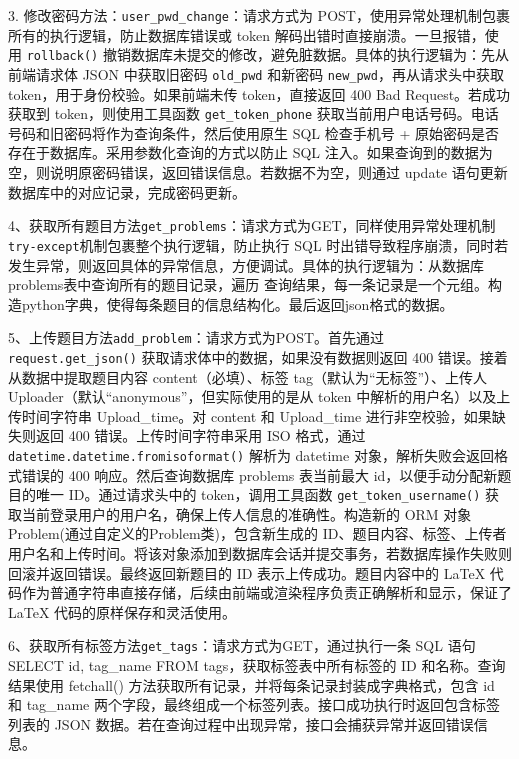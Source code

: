 \documentclass[a4paper,AutoFakeBold={2.7}]{ctexart} %
\begin{document}
3. 修改密码方法：\texttt{user\_pwd\_change}：请求方式为 POST，使用异常处理机制包裹所有的执行逻辑，防止数据库错误或 token 解码出错时直接崩溃。一旦报错，使用 \texttt{rollback()} 撤销数据库未提交的修改，避免脏数据。具体的执行逻辑为：先从前端请求体 JSON 中获取旧密码 \texttt{old\_pwd} 和新密码 \texttt{new\_pwd}，再从请求头中获取 token，用于身份校验。如果前端未传 token，直接返回 400 Bad Request。若成功获取到 token，则使用工具函数 \texttt{get\_token\_phone} 获取当前用户电话号码。电话号码和旧密码将作为查询条件，然后使用原生 SQL 检查手机号 + 原始密码是否存在于数据库。采用参数化查询的方式以防止 SQL 注入。如果查询到的数据为空，则说明原密码错误，返回错误信息。若数据不为空，则通过 update 语句更新数据库中的对应记录，完成密码更新。

4、获取所有题目方法\texttt{get\_problems}：请求方式为GET，同样使用异常处理机制\texttt{try-except}机制包裹整个执行逻辑，防止执行 SQL 时出错导致程序崩溃，同时若发生异常，则返回具体的异常信息，方便调试。具体的执行逻辑为：从数据库problems表中查询所有的题目记录，遍历 查询结果，每一条记录是一个元组。构造python字典，使得每条题目的信息结构化。最后返回json格式的数据。

5、上传题目方法\texttt{add\_problem}：请求方式为POST。首先通过 \texttt{request.get\_json()} 获取请求体中的数据，如果没有数据则返回 400 错误。接着从数据中提取题目内容 content（必填）、标签 tag（默认为“无标签”）、上传人 Uploader（默认“anonymous”，但实际使用的是从 token 中解析的用户名）以及上传时间字符串 Upload\_time。对 content 和 Upload\_time 进行非空校验，如果缺失则返回 400 错误。上传时间字符串采用 ISO 格式，通过 \texttt{datetime.datetime.fromisoformat()} 解析为 datetime 对象，解析失败会返回格式错误的 400 响应。然后查询数据库 problems 表当前最大 id，以便手动分配新题目的唯一 ID。通过请求头中的 token，调用工具函数 \texttt{get\_token\_username()} 获取当前登录用户的用户名，确保上传人信息的准确性。构造新的 ORM 对象 Problem(通过自定义的Problem类)，包含新生成的 ID、题目内容、标签、上传者用户名和上传时间。将该对象添加到数据库会话并提交事务，若数据库操作失败则回滚并返回错误。最终返回新题目的 ID 表示上传成功。题目内容中的 LaTeX 代码作为普通字符串直接存储，后续由前端或渲染程序负责正确解析和显示，保证了 LaTeX 代码的原样保存和灵活使用。

6、获取所有标签方法\texttt{get\_tags}：请求方式为GET，通过执行一条 SQL 语句 SELECT id, tag\_name FROM tags，获取标签表中所有标签的 ID 和名称。查询结果使用 fetchall() 方法获取所有记录，并将每条记录封装成字典格式，包含 id 和 tag\_name 两个字段，最终组成一个标签列表。接口成功执行时返回包含标签列表的 JSON 数据。若在查询过程中出现异常，接口会捕获异常并返回错误信息。
\end{document}
